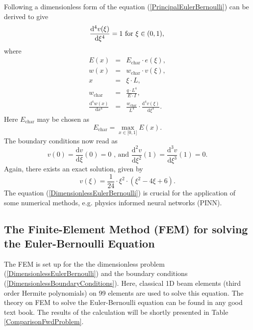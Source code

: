\documentclass[a4paper,11pt]{article}
\begin{document}
Following \cite[pp. 3]{hoffmann2014modellierung} a dimensionless form of the equation (\ref{PrincipalEulerBernoulli}) can be derived to give
\begin{equation} \label{DimensionlessEulerBernoulli}
\frac{\mathrm{d}^4 v(\xi)}{\mathrm{d}\xi^4} = 1 \text{ for } \xi \in (0,1),\\
\end{equation}
where
\begin{eqnarray*}
E (x) &=& E_{\operatorname{char}} \cdot e(\xi ) , \\
w(x) &=& w_{\operatorname{char}} \cdot v(\xi ) , \\
x &=& \xi\cdot L, \\
w_{\operatorname{char}} & = & \frac{q\cdot L^4}{E\cdot I }, \\
\frac{\mathrm{d}^4 w(x)}{\mathrm{d}x^4} & = & \frac{w_{\operatorname{char}}}{L^4}\cdot \frac{\mathrm{d}^4 v(\xi)}{\mathrm{d}\xi^4}.
\end{eqnarray*}
Here $E_{\operatorname{char}} $ may be chosen as 
\begin{equation*}
E_{\operatorname{char}} = \operatorname{max}_{x\in \lbrack 0,1 \rbrack } E(x) .
\end{equation*}
The boundary conditions now read as
\begin{equation} \label{DimensionlessBoundaryConditions}
v( 0) = \frac{\mathrm{d} v}{\mathrm{d}\xi }(0) = 0 \text{ , and } \frac{\mathrm{d}^2 v}{\mathrm{d}\xi^2}(1) = \frac{\mathrm{d}^3 v}{\mathrm{d}\xi^3}(1) = 0.
\end{equation}
Again, there exists an exact solution, given by
\begin{equation*} 
v(\xi ) = \frac{1}{24} \cdot \xi^2 \cdot \left( \xi^2 -4 \xi + 6 \right) .
\end{equation*}
The equation (\ref{DimensionlessEulerBernoulli}) is crucial for the application of some numerical methods, e.g. physics informed neural networks (PINN).


\subsection*{The Finite-Element Method (FEM) for solving the Euler-Bernoulli Equation}
The FEM is set up for the the dimensionless problem (\ref{DimensionlessEulerBernoulli}) and the boundary conditions (\ref{DimensionlessBoundaryConditions}). Here, classical 1D beam elements (third order Hermite polynomials) on 99 elements are used to solve this equation. The theory on FEM to solve the Euler-Bernoulli equation can be found in any good text book.
The results of the calculation will be shortly presented in Table \ref{ComparisonFwdProblem}.
\end{document}
